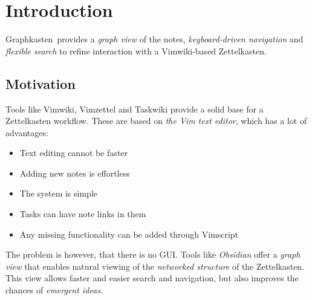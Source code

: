 \documentclass{article}
\title{\projectname}
\author{Kryštof Albrecht \\ \href{mailto:krystofalbrechtus@gmail.com}{krystofalbrechtus@gmail.com}}
\newcommand{\projectname}{Graphkasten}
\begin{document}
\maketitle
\tableofcontents

\newpage

\section{Introduction}

\projectname\ provides a \emph{graph view} of the notes, \emph{keyboard-driven navigation} and \emph{flexible search} to refine interaction with a Vimwiki-based Zettelkasten.

\subsection{Motivation}

Tools like Vimwiki, Vimzettel and Taskwiki provide a solid base for a Zettelkasten workflow. These are based on \emph{the Vim text editor}, which has a lot of advantages:

\begin{itemize}
	\item Text editing cannot be faster
	
	\item Adding new notes is effortless

	\item The system is simple

	\item Tasks can have note links in them

	\item Any missing functionality can be added through Vimscript
\end{itemize}

The problem is however, that there is no GUI. Tools like \emph{Obsidian} offer a \emph{graph view} that enables natural viewing of the \emph{networked structure} of the Zettelkasten. This view allows faster and easier search and navigation, but also improves the chances of \emph{emergent ideas.}
\end{document}

